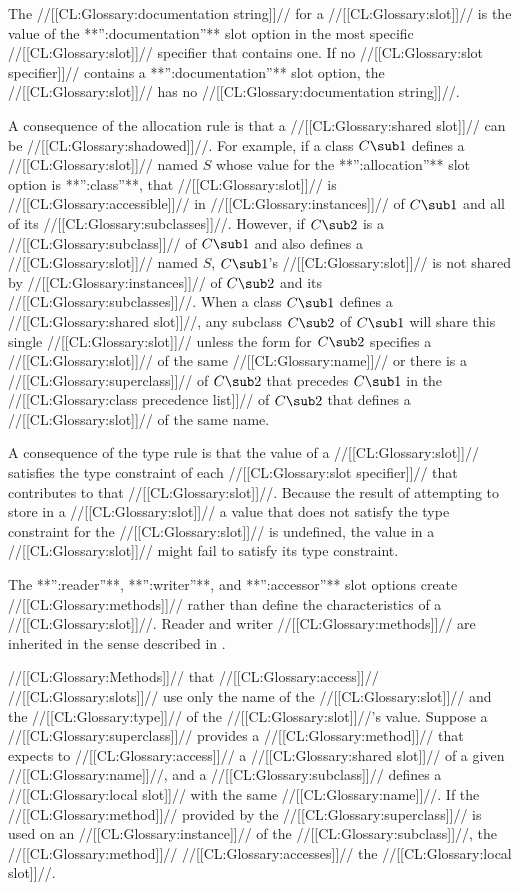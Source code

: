 \itemitem{\bull} The //[[CL:Glossary:documentation string]]// for a //[[CL:Glossary:slot]]// is the value of
the **'':documentation''** slot option in the most specific //[[CL:Glossary:slot]]//
specifier that contains one.  If no //[[CL:Glossary:slot specifier]]// contains a
**'':documentation''** slot option, the //[[CL:Glossary:slot]]// has no //[[CL:Glossary:documentation string]]//.

\endlist

A consequence of the allocation rule is that a //[[CL:Glossary:shared slot]]// can be
//[[CL:Glossary:shadowed]]//.  For example, if a class $C\sub 1$ defines 
a //[[CL:Glossary:slot]]// named $S$
whose value for the **'':allocation''** slot option is **'':class''**,
that //[[CL:Glossary:slot]]// is //[[CL:Glossary:accessible]]// 
in //[[CL:Glossary:instances]]// of $C\sub 1$ and all of its
//[[CL:Glossary:subclasses]]//.  However, if $C\sub 2$ is a //[[CL:Glossary:subclass]]// 
of $C\sub 1$ and also
defines a //[[CL:Glossary:slot]]// named $S$\negthinspace, $C\sub 1$'s 
//[[CL:Glossary:slot]]// is not shared
by //[[CL:Glossary:instances]]// of $C\sub 2$ and its //[[CL:Glossary:subclasses]]//. When a class
$C\sub 1$ defines a //[[CL:Glossary:shared slot]]//, any subclass $C\sub 2$ of $C\sub
1$ will share this single //[[CL:Glossary:slot]]// 
unless the  form for
$C\sub 2$ specifies a //[[CL:Glossary:slot]]// of the same 
//[[CL:Glossary:name]]// or there is a //[[CL:Glossary:superclass]]//
of $C\sub 2$ that precedes $C\sub 1$ in the //[[CL:Glossary:class precedence list]]// of
$C\sub 2$ that defines a //[[CL:Glossary:slot]]// of the same name.

A consequence of the type rule is that the value of a //[[CL:Glossary:slot]]//
satisfies the type constraint of each //[[CL:Glossary:slot specifier]]// that
contributes to that //[[CL:Glossary:slot]]//.  Because the result of attempting to
store in a //[[CL:Glossary:slot]]// a value that does not satisfy the type
constraint for the //[[CL:Glossary:slot]]// is undefined, the value in a //[[CL:Glossary:slot]]//
might fail to satisfy its type constraint.
     
The **'':reader''**, **'':writer''**, and **'':accessor''** slot options
create //[[CL:Glossary:methods]]// rather than define the characteristics of a //[[CL:Glossary:slot]]//.
Reader and writer //[[CL:Glossary:methods]]// are inherited in the sense described in
\secref\MethodInheritance.

//[[CL:Glossary:Methods]]// that //[[CL:Glossary:access]]// //[[CL:Glossary:slots]]// use only the name of the
//[[CL:Glossary:slot]]// and the //[[CL:Glossary:type]]// of the //[[CL:Glossary:slot]]//'s value.  Suppose
a //[[CL:Glossary:superclass]]// provides a //[[CL:Glossary:method]]// that expects to //[[CL:Glossary:access]]// a
//[[CL:Glossary:shared slot]]// of a given //[[CL:Glossary:name]]//, and a //[[CL:Glossary:subclass]]// defines
a //[[CL:Glossary:local slot]]// with the same //[[CL:Glossary:name]]//.  If the //[[CL:Glossary:method]]// provided 
by the //[[CL:Glossary:superclass]]// is used on an //[[CL:Glossary:instance]]// of the //[[CL:Glossary:subclass]]//, 
the //[[CL:Glossary:method]]// //[[CL:Glossary:accesses]]// the //[[CL:Glossary:local slot]]//.

\endsubsection%

